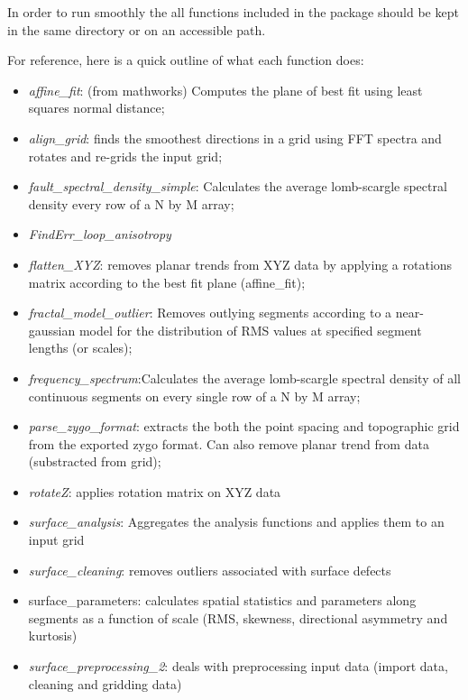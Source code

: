 \documentclass[12pt,a4paper]{article}
\begin{document}
In order to run smoothly the all functions included in the package should be kept in the same directory or on an accessible path. 

For reference, here is a quick outline of what each function does:

\begin{itemize}
	\item[] \textit{affine\_fit}: (from mathworks) Computes the plane of best fit using least squares normal distance;
	\item[] \textit{align\_grid}: finds the smoothest directions in a grid using FFT spectra and rotates and re-grids the input grid;
	\item[] \textit{fault\_spectral\_density\_simple}: Calculates the average lomb-scargle spectral density every row of a N by M array;
	\item[] \textit{FindErr\_loop\_anisotropy}
	\item[] \textit{flatten\_XYZ}: removes planar trends from XYZ data by applying a rotations matrix according to the best fit plane (affine\_fit);
	\item[] \textit{fractal\_model\_outlier}: Removes outlying segments according to a near-gaussian model for the distribution of RMS values at specified segment lengths (or scales);
	\item[] \textit{frequency\_spectrum}:Calculates the average lomb-scargle spectral density of all continuous 	segments on every single row of a N by M array;
	\item[] \textit{parse\_zygo\_format}: extracts the both the point spacing and topographic grid from the exported zygo format. Can also remove planar trend from data (substracted from grid);
	\item[] \textit{rotateZ}: applies rotation matrix on XYZ data
	\item[] \textit{surface\_analysis}: Aggregates the analysis functions and applies them to an input grid
	\item[] \textit{surface\_cleaning}: removes outliers associated with surface defects
	\item[] surface\_parameters: calculates spatial statistics and parameters along segments as a function of scale (RMS, skewness, directional asymmetry and kurtosis)
	\item[] \textit{surface\_preprocessing\_2}: deals with preprocessing input data (import data, cleaning and gridding data)
\end{itemize}
\end{document}
